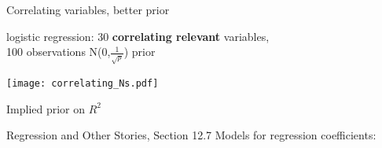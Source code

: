 \documentclass[english,t]{beamer}
\begin{document}
\begin{frame}{Correlating variables, better prior}

  logistic regression: 30 \textbf{correlating relevant} variables, \\100
  observations
  {N(0,$\frac{1}{\sqrt{p}}$) prior}
  
  {\texttt{[image: correlating\_Ns.pdf]}}

\end{frame}

\begin{frame}{Implied prior on $R^2$}

  Regression and Other Stories, Section 12.7 Models for regression
  coefficients: 


  
\end{frame}
\end{document}
